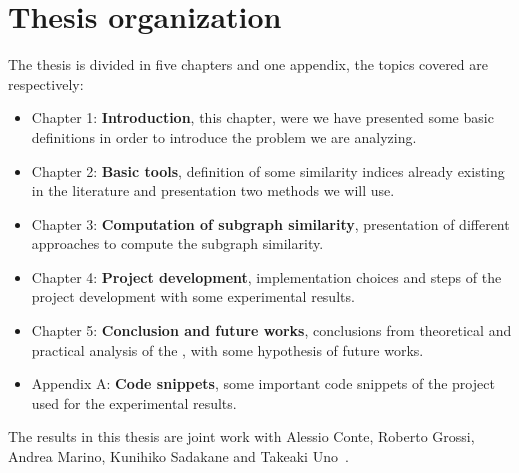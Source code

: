


\section{Thesis organization}

The thesis is divided in five chapters and one appendix,
the topics covered are respectively:

\begin{itemize}
	\item Chapter 1: \textbf{Introduction}, this chapter, were we have presented some basic definitions in order to introduce the problem we are analyzing.
	
	\item Chapter 2: \textbf{Basic tools}, definition of some similarity indices already existing in the literature and presentation two methods we will use.
	
	\item Chapter 3: \textbf{Computation of subgraph similarity}, presentation of different approaches to compute the subgraph similarity.
	
	\item Chapter 4: \textbf{Project development}, implementation choices and steps of the project development with some experimental results.
	
	\item Chapter 5: \textbf{Conclusion and future works}, conclusions from theoretical and practical analysis of the , with some hypothesis of future works.
	
	\item Appendix A: \textbf{Code snippets}, some important code snippets of the project used for the experimental results.
\end{itemize}

The results in this thesis are joint work with Alessio Conte, Roberto Grossi, Andrea Marino, Kunihiko Sadakane and Takeaki Uno~\cite{SubSim}.